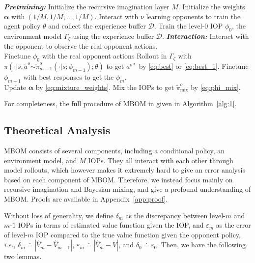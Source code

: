 \documentclass{article}
\begin{document}
\newcommand{\unsim}{\mathord{\sim}}
\begin{algorithm}[t]
	\caption{MBOM}
	\label{alg:1}
\small
\begin{algorithmic}[1]
		\STATE \textit{\textbf{Pretraining:}}
		\STATE Initialize the recursive imagination layer $M$.	
		\STATE Initialize the weights $\bm{\alpha}$ with $(1/M, 1/M, \dots, 1/M)$.
		\STATE Interact with $\nu$ learning opponents to train the agent policy $\theta$ and collect the experience buffer $\mathcal{D}$.
		\STATE Train the level-0 IOP $\phi_0$, the environment model $\Gamma_{\zeta}$ using the experience buffer $\mathcal{D}$.
		\STATE \textit{\textbf{Interaction:}}					
		\STATE Interact with the opponent to observe the real opponent actions.\\
		\STATE Finetune $\phi_0$ with the real opponent actions
		\STATE Rollout in $\Gamma_\zeta$ with $\pi(\cdot |s, \tilde{a}^o \unsim \tilde{\pi}^o_{m-1}(\cdot|s;\phi_{m-1});\theta)$ to get $a^{o*}$ by \eqref{eq:best} or \eqref{eq:best_1}.
		\STATE Finetune $\phi_{m-1}$ with best responses to get the $\phi_m$.
		\ENDFOR	\\
		\STATE Update $\bm{\alpha}$ by \eqref{eq:mixture_weights}.	
		\STATE Mix the IOPs to get $\tilde{\pi}_{\operatorname{mix}}^o$ by \eqref{eq:phi_mix}.
		\ENDFOR		
\end{algorithmic}
\end{algorithm}

For completeness, the full procedure of MBOM in given in Algorithm~\ref{alg:1}.

\subsection{Theoretical Analysis}

MBOM consists of several components, including a conditional policy, an environment model, and $M$ IOPs. They all interact with each other through model rollouts, which however makes it extremely hard to give an error analysis based on each component of MBOM. Therefore, we instead focus mainly on recursive imagination and Bayesian mixing, and give a profound understanding of MBOM. Proofs are available in Appendix~\ref{app:proof}.

Without loss of generality, we define $\delta_m$ as the discrepancy between level-$m$ and $m$-$1$ IOPs in terms of estimated value function given the IOP, and $\varepsilon_m$ as the error of level-$m$ IOP compared to the true value function given the opponent policy, \textit{i.e.}, $\delta_m \doteq |\widehat{V}_m-\widehat{V}_{m-1}|$, $\varepsilon_m \doteq |\widehat{V}_m - V|$, and $\delta_0 \doteq \varepsilon_0$. Then, we have the following two lemmas. 
\end{document}
